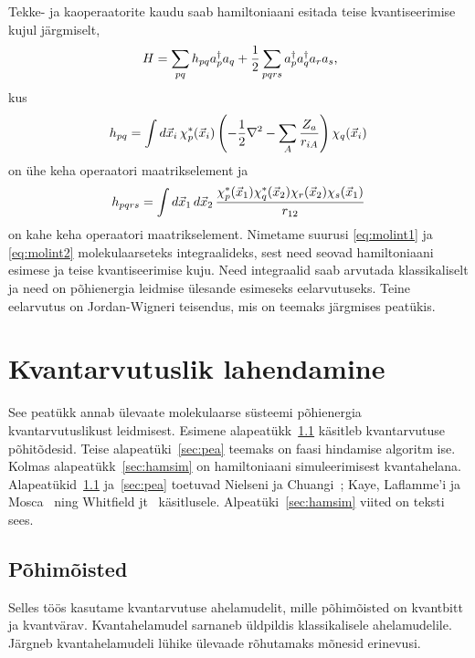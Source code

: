 \documentclass[12pt]{report}
\def\paren#1{\left(#1\right)}
\def\d#1{\mathinner{d#1}}
\begin{document}
Tekke- ja kaoperaatorite kaudu saab hamiltoniaani esitada teise kvantiseerimise kujul järgmiselt,
\begin{align}
    H = \sum_{pq}h_{pq}a_p^\dagger a_q
    + \frac{1}{2} \sum_{pqrs} a_p^\dagger a_q^\dagger a_r a_s \rlap{,}
\end{align}
kus
\begin{align}\label{eq:molint1}
    h_{pq} = \int\d{\vec{x}_i} \chi_p^*(\vec{x}_i)
    \paren{-\frac{1}{2} \nabla^2 - \sum_A \frac{Z_a}{r_{iA}}} \chi_q(\vec{x}_i)
\end{align}
on ühe keha operaatori maatrikselement ja
\begin{align}\label{eq:molint2}
    h_{pqrs} = \int \d{\vec{x}_1} \d{\vec{x}_2}
    \frac{\chi_p^*(\vec{x}_1) \chi_q^*(\vec{x}_2) \chi_r(\vec{x}_2) \chi_s(\vec{x}_1)}{r_{12}}
\end{align}
on kahe keha operaatori maatrikselement.
Nimetame suurusi \eqref{eq:molint1} ja \eqref{eq:molint2} molekulaarseteks integraalideks, sest need seovad hamiltoniaani esimese ja teise kvantiseerimise kuju.
Need integraalid saab arvutada klassikaliselt ja need on põhienergia leidmise ülesande esimeseks eelarvutuseks. Teine eelarvutus on Jordan-Wigneri teisendus, mis on teemaks järgmises peatükis.

\chapter{Kvantarvutuslik lahendamine}\label{chap:qcomp}

See peatükk annab ülevaate molekulaarse süsteemi põhienergia kvantarvutuslikust leidmisest.
Esimene alapeatükk~\ref{sec:terms} käsitleb kvantarvutuse põhitõdesid.
Teise alapeatüki~\ref{sec:pea} teemaks on faasi hindamise algoritm ise.
Kolmas alapeatükk~\ref{sec:hamsim} on hamiltoniaani simuleerimisest kvantahelana.
Alapeatükid~\ref{sec:terms} ja~\ref{sec:pea} toetuvad Nielseni ja Chuangi~\cite{nielsen+chuang}; Kaye, Laflamme'i ja Mosca~\cite{kaye+laflamme+mosca} ning Whitfield jt~\cite{whitfield+etal2011} käsitlusele.
Alpeatüki~\ref{sec:hamsim} viited on teksti sees.

\section{Põhimõisted}\label{sec:terms}

Selles töös kasutame kvantarvutuse ahelamudelit, mille põhimõisted on kvantbitt ja kvantvärav.
Kvantahelamudel sarnaneb üldpildis klassikalisele ahelamudelile.
Järgneb kvantahelamudeli lühike ülevaade rõhutamaks mõnesid erinevusi.
\end{document}
